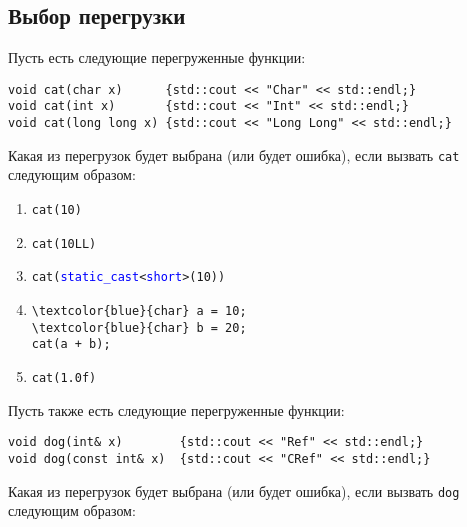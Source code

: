 \documentclass{article}
\begin{document}
\subsection{Выбор перегрузки}
Пусть есть следующие перегруженные функции:
\begin{lstlisting}
void cat(char x)      {std::cout << "Char" << std::endl;}
void cat(int x)       {std::cout << "Int" << std::endl;}
void cat(long long x) {std::cout << "Long Long" << std::endl;}
\end{lstlisting}
Какая из перегрузок будет выбрана (или будет ошибка), если вызвать \texttt{cat} следующим образом:
\begin{enumerate}
\item \texttt{cat(10)}
\item \texttt{cat(10LL)}
\item \texttt{cat(\textcolor{blue}{static\_cast}<\textcolor{blue}{short}>(10))} 

\item \begin{Verbatim}[commandchars=\\\{\}]
\textcolor{blue}{char} a = 10;
\textcolor{blue}{char} b = 20;
cat(a + b);
\end{Verbatim}

\item \texttt{cat(1.0f)}
\end{enumerate}
Пусть также есть следующие перегруженные функции:
\begin{lstlisting}
void dog(int& x)        {std::cout << "Ref" << std::endl;}
void dog(const int& x)  {std::cout << "CRef" << std::endl;}
\end{lstlisting}
Какая из перегрузок будет выбрана (или будет ошибка), если вызвать \texttt{dog} следующим образом:
\end{document}
